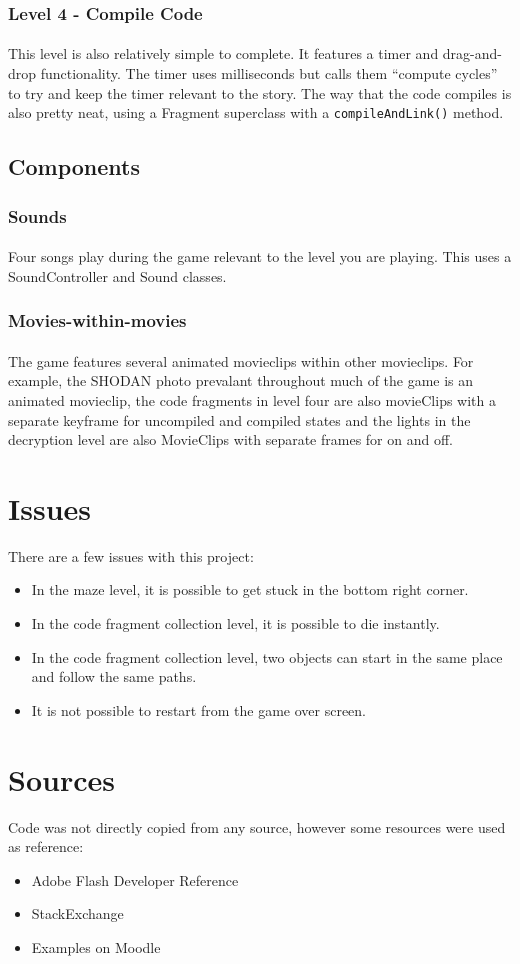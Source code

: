 \documentclass{article}
\begin{document}
\subsubsection {Level 4 - Compile Code}
\paragraph{}
This level is also relatively simple to complete. It features a timer and drag-and-drop functionality. The timer uses milliseconds but calls them ``compute cycles'' to try and keep the timer relevant to the story. The way that the code compiles is also pretty neat, using a Fragment superclass with a \texttt{compileAndLink()} method.
\subsection {Components}
\subsubsection {Sounds}
\paragraph{}
Four songs play during the game relevant to the level you are playing. This uses a SoundController and Sound classes.
\subsubsection {Movies-within-movies}
\paragraph{}
The game features several animated movieclips within other movieclips. For example, the SHODAN photo prevalant throughout much of the game is an animated movieclip, the code fragments in level four are also movieClips with a separate keyframe for uncompiled and compiled states and the lights in the decryption level are also MovieClips with separate frames for on and off.

\section {Issues}
There are a few issues with this project:
\begin{itemize}
\item{In the maze level, it is possible to get stuck in the bottom right corner.}
\item{In the code fragment collection level, it is possible to die instantly.}
\item{In the code fragment collection level, two objects can start in the same place and follow the same paths.}
\item{It is not possible to restart from the game over screen.}
\end{itemize}

\section {Sources}
Code was not directly copied from any source, however some resources were used as reference:
\begin{itemize}
\item{Adobe Flash Developer Reference}
\item{StackExchange}
\item{Examples on Moodle}
\end{itemize}
\end{document}
